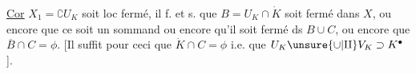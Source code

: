 \uline{Cor}    $X_1=\complement U_K$ soit loc fermé, il f. et s. que $B=U_K\cap\dot K$ soit    fermé dans $X$,  ou encore que ce soit un sommand    ou encore qu'il soit fermé ds $B\cup C$, ou encore que $\overline B\cap C=\phi$. [Il suffit pour ceci que $\dot K\cap C=\phi$ i.e. que $U_K\unsure{\cup|\amalg}V_K\supset K^{\bullet}$]. 
